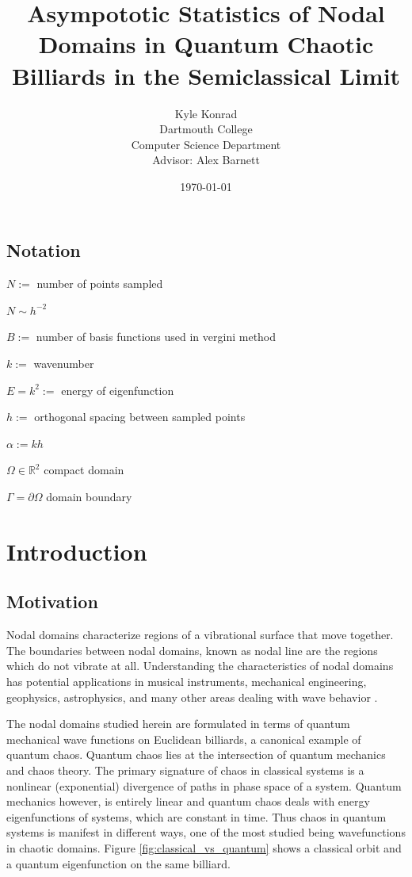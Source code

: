 \documentclass{report}
\begin{document}
\title{Asympototic Statistics of Nodal Domains in Quantum Chaotic Billiards in the Semiclassical Limit}
\author{Kyle Konrad\\
  Dartmouth College\\
  Computer Science Department\\
  Advisor: Alex Barnett}
\date{\today}


\section*{Notation}
$N :=$ number of points sampled

$N \sim h^{-2}$

$B :=$ number of basis functions used in vergini method

$k :=$ wavenumber

$E = k^{2} :=$ energy of eigenfunction

$h :=$ orthogonal spacing between sampled points

$\alpha := k h$

$\Omega \in \mathbb{R}^2$ compact domain

$\Gamma = \partial \Omega$ domain boundary

\chapter{Introduction}
\label{chap:intro}
\section{Motivation}
\label{sec:motivation}
Nodal domains characterize regions of a vibrational surface that move together. The boundaries between nodal domains, known as nodal line are the regions which do not vibrate at all. Understanding the characteristics of nodal domains has potential applications in musical instruments, mechanical engineering, geophysics, astrophysics, and many other areas dealing with wave behavior \cite{wigman}.

The nodal domains studied herein are formulated in terms of quantum mechanical wave functions on Euclidean billiards, a canonical example of quantum chaos. Quantum chaos lies at the intersection of quantum mechanics and chaos theory. The primary signature of chaos in classical systems is a nonlinear (exponential) divergence of paths in phase space of a system. Quantum mechanics however, is entirely linear and quantum chaos deals with energy eigenfunctions of systems, which are constant in time. Thus chaos in quantum systems is manifest in different ways, one of the most studied being wavefunctions in chaotic domains. Figure \ref{fig:classical_vs_quantum} shows a classical orbit and a quantum eigenfunction on the same billiard.
\end{document}
